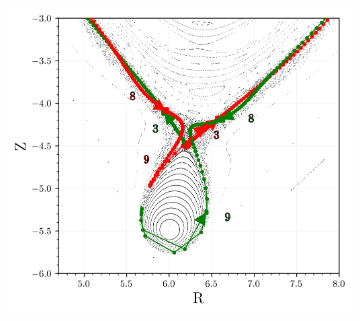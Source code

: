 \begin{figure}[H]
\begin{minipage}{0.45\textwidth}
\begin{subfigure}[b]{0.99\textwidth}
            \includegraphics[width=\textwidth]{images/manifold/manifold_closer.png}
            \caption{}
            \label{fig:man-b}
        \end{subfigure}
    \end{minipage}%
    \begin{minipage}{0.5\textwidth} %
        \centering
        \begin{subfigure}[b]{\textwidth}
            \centering

\end{subfigure}
\end{minipage}
\end{figure}
